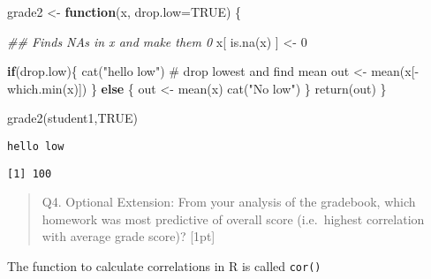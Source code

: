 \documentclass[
  letterpaper,
  DIV=11,
  numbers=noendperiod]{scrartcl}
\newenvironment{Shaded}{\begin{snugshade}}{\end{snugshade}}
\newcommand{\AttributeTok}[1]{\textcolor[rgb]{0.40,0.45,0.13}{#1}}
\newcommand{\CommentTok}[1]{\textcolor[rgb]{0.37,0.37,0.37}{#1}}
\newcommand{\ConstantTok}[1]{\textcolor[rgb]{0.56,0.35,0.01}{#1}}
\newcommand{\ControlFlowTok}[1]{\textcolor[rgb]{0.00,0.23,0.31}{\textbf{#1}}}
\newcommand{\DecValTok}[1]{\textcolor[rgb]{0.68,0.00,0.00}{#1}}
\newcommand{\DocumentationTok}[1]{\textcolor[rgb]{0.37,0.37,0.37}{\textit{#1}}}
\newcommand{\FunctionTok}[1]{\textcolor[rgb]{0.28,0.35,0.67}{#1}}
\newcommand{\NormalTok}[1]{\textcolor[rgb]{0.00,0.23,0.31}{#1}}
\newcommand{\OtherTok}[1]{\textcolor[rgb]{0.00,0.23,0.31}{#1}}
\newcommand{\SpecialCharTok}[1]{\textcolor[rgb]{0.37,0.37,0.37}{#1}}
\newcommand{\StringTok}[1]{\textcolor[rgb]{0.13,0.47,0.30}{#1}}
\begin{document}
\begin{Shaded}
\begin{Highlighting}[]
\NormalTok{grade2 }\OtherTok{\textless{}{-}} \ControlFlowTok{function}\NormalTok{(x, }\AttributeTok{drop.low=}\ConstantTok{TRUE}\NormalTok{) \{}

  \DocumentationTok{\#\# Finds NAs in \textquotesingle{}x\textquotesingle{} and make them 0}
\NormalTok{x[ }\FunctionTok{is.na}\NormalTok{(x) ] }\OtherTok{\textless{}{-}} \DecValTok{0}

\ControlFlowTok{if}\NormalTok{(drop.low)\{}
  \FunctionTok{cat}\NormalTok{(}\StringTok{"hello low"}\NormalTok{)}
  \CommentTok{\# drop lowest and find mean}
\NormalTok{out }\OtherTok{\textless{}{-}} \FunctionTok{mean}\NormalTok{(x[}\SpecialCharTok{{-}}\FunctionTok{which.min}\NormalTok{(x)])}
\NormalTok{\} }\ControlFlowTok{else}\NormalTok{ \{}
\NormalTok{  out }\OtherTok{\textless{}{-}} \FunctionTok{mean}\NormalTok{(x)}
  \FunctionTok{cat}\NormalTok{(}\StringTok{"No low"}\NormalTok{)}
\NormalTok{\}}
\FunctionTok{return}\NormalTok{(out)}
\NormalTok{\}}
\end{Highlighting}
\end{Shaded}

\begin{Shaded}
\begin{Highlighting}[]
\FunctionTok{grade2}\NormalTok{(student1,}\ConstantTok{TRUE}\NormalTok{)}
\end{Highlighting}
\end{Shaded}

\begin{verbatim}
hello low
\end{verbatim}

\begin{verbatim}
[1] 100
\end{verbatim}

\begin{quote}
Q4. Optional Extension: From your analysis of the gradebook, which
homework was most predictive of overall score (i.e.~highest correlation
with average grade score)? {[}1pt{]}
\end{quote}

The function to calculate correlations in R is called \texttt{cor()}

\begin{Shaded}
\end{Shaded}
\end{document}
